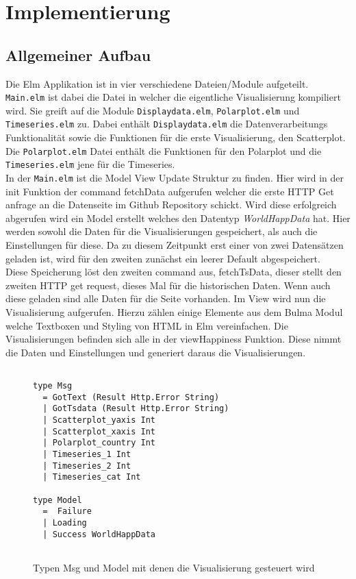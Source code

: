 \section{Implementierung}
\subsection{Allgemeiner Aufbau}
Die Elm Applikation ist in vier verschiedene Dateien/Module aufgeteilt. \texttt{Main.elm} ist dabei die Datei in welcher die eigentliche Visualisierung kompiliert wird. 
Sie greift auf die Module \texttt{Displaydata.elm}, \texttt{Polarplot.elm} und \texttt{Timeseries.elm} zu. 
Dabei enthält \texttt{Displaydata.elm} die Datenverarbeitungs Funktionalität sowie die Funktionen für die erste Visualisierung, den Scatterplot. 
Die \texttt{Polarplot.elm} Datei enthält die Funktionen für den Polarplot 
und die \break \texttt{Timeseries.elm} jene für die Timeseries.\\

In der \texttt{Main.elm} ist die Model View Update Struktur zu finden. 
Hier wird in der init Funktion der command fetchData aufgerufen welcher die erste HTTP Get anfrage an die Datenseite im Github Repository schickt. 
Wird diese erfolgreich abgerufen wird ein Model erstellt welches den Datentyp \textit{WorldHappData} hat. 
Hier werden sowohl die Daten für die Visualisierungen gespeichert, als auch die Einstellungen für diese. Da zu diesem Zeitpunkt erst einer von zwei Datensätzen geladen ist, wird für den zweiten zunächst ein leerer Default abgespeichert. \\

Diese Speicherung löst den zweiten command aus, fetchTsData, dieser stellt den zweiten HTTP get request, dieses Mal für die historischen Daten. Wenn auch diese geladen sind alle Daten für die Seite vorhanden. Im View wird nun die Visualisierung aufgerufen. Hierzu zählen einige Elemente aus dem Bulma Modul welche Textboxen und Styling von HTML in Elm vereinfachen. Die Visualisierungen befinden sich alle in der viewHappiness Funktion. Diese nimmt die Daten und Einstellungen und generiert daraus die Visualisierungen. \\

\begin{figure}[ht]
\centering
\begin{mdframed}[backgroundcolor=backcolour]
\begin{verbatim}

type Msg
  = GotText (Result Http.Error String)
  | GotTsdata (Result Http.Error String)
  | Scatterplot_yaxis Int
  | Scatterplot_xaxis Int
  | Polarplot_country Int
  | Timeseries_1 Int
  | Timeseries_2 Int
  | Timeseries_cat Int

type Model 
  =  Failure
  | Loading
  | Success WorldHappData
  
\end{verbatim}
\end{mdframed}
    \caption{Typen Msg und Model mit denen die Visualisierung gesteuert wird}
    \label{fig:Msg_Model}
\end{figure}

